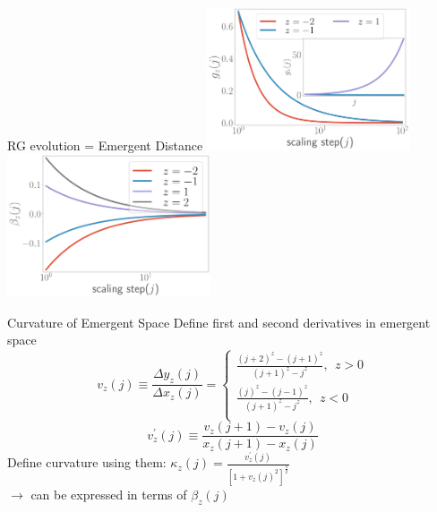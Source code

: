 \documentclass[12pt,aspectratio=169]{beamer}
\begin{document}
\begin{frame}{RG evolution = Emergent Distance}
{	\includegraphics[width=0.45\textwidth]{figures/coupling.pdf}
	\hspace*{30pt}
	\includegraphics[width=0.45\textwidth]{figures/mass-beta.pdf}
}
\end{frame}

\begin{frame}{Curvature of Emergent Space}
	Define first and second derivatives in emergent space
	\[v_z(j) \equiv \frac{\Delta y_z(j)}{\Delta x_z(j)} =\begin{cases}
		\frac{\left(j+2\right)^z - \left(j+1\right)^z}{\left(j+1\right)^z - j^z},~ ~ z > 0\\
		\frac{\left(j\right)^z - \left(j-1\right)^z}{\left(j+1\right)^z - j^z},~ ~ z < 0\\
	\end{cases}
\]
\[
	v^\prime_z(j) \equiv \frac{v_z(j+1) - v_z(j)}{x_z(j+1) - x_z(j)}
\]
Define curvature using them: {\(\kappa_{z}(j) = \frac{v^\prime_z(j)}{\left[1 + v_z(j)^2\right]^\frac{3}{2}}\)}\\[10pt]
\(\longrightarrow\) can be expressed in terms of \(\beta_z(j)\)
\end{frame}
\end{document}
